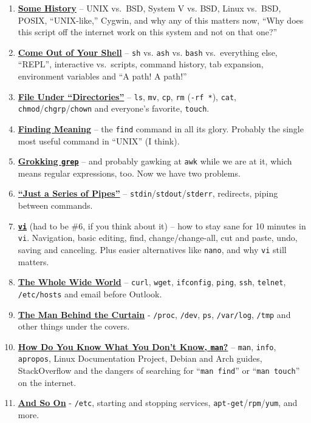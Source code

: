 \documentclass[10pt,]{book}
\numberwithin{figure}{chapter}
\begin{document}
\begin{enumerate}
\def\labelenumi{\arabic{enumi}.}
\setcounter{enumi}{-1}
\item
  \hyperref[step-0.-some-history]{\textbf{Some History}} -- UNIX
  vs.~BSD, System V vs. BSD, Linux vs.~BSD, POSIX, ``UNIX-like,''
  Cygwin, and why any of this matters now, ``Why does this script off
  the internet work on this system and not on that one?''
\item
  \hyperref[step-1.-come-out-of-your-shell]{\textbf{Come Out of Your
  Shell}} -- \texttt{sh} vs. \texttt{ash} vs. \texttt{bash}
  vs.~everything else, ``REPL'', interactive vs.~scripts, command
  history, tab expansion, environment variables and ``A path! A path!''
\item
  \hyperref[step-2.-file-under-directories]{\textbf{File Under
  ``Directories''}} -- \texttt{ls}, \texttt{mv}, \texttt{cp},
  \texttt{rm} (\texttt{-rf *}), \texttt{cat},
  \texttt{chmod}/\texttt{chgrp}/\texttt{chown} and everyone's favorite,
  \texttt{touch}.
\item
  \hyperref[step-3.-finding-meaning]{\textbf{Finding Meaning}} -- the
  \texttt{find} command in all its glory. Probably the single most
  useful command in ``UNIX'' (I think).
\item
  \hyperref[step-4.-grokking-grep]{\textbf{Grokking \texttt{grep}}} --
  and probably gawking at \texttt{awk} while we are at it, which means
  regular expressions, too. Now we have two problems.
\item
  \hyperref[step-5.-just-a-series-of-pipes]{\textbf{``Just a Series of
  Pipes''}} -- \texttt{stdin}/\texttt{stdout}/\texttt{stderr},
  redirects, piping between commands.
\item
  \hyperref[step-6.-vi]{\textbf{\texttt{vi}}} (had to be \#6, if you
  think about it) -- how to stay sane for 10 minutes in \texttt{vi}.
  Navigation, basic editing, find, change/change-all, cut and paste,
  undo, saving and canceling. Plus easier alternatives like
  \texttt{nano}, and why \texttt{vi} still matters.
\item
  \hyperref[step-7.-the-whole-wide-world]{\textbf{The Whole Wide World}}
  -- \texttt{curl}, \texttt{wget}, \texttt{ifconfig}, \texttt{ping},
  \texttt{ssh}, \texttt{telnet}, \texttt{/etc/hosts} and email before
  Outlook.
\item
  \hyperref[step-8.-the-man-behind-the-curtain]{\textbf{The Man Behind
  the Curtain}} - \texttt{/proc}, \texttt{/dev}, \texttt{ps},
  \texttt{/var/log}, \texttt{/tmp} and other things under the covers.
\item
  \hyperref[step-9.-how-do-you-know-what-you-dont-know-man]{\textbf{How
  Do You Know What You Don't Know, \texttt{man}?}} -- \texttt{man},
  \texttt{info}, \texttt{apropos}, Linux Documentation Project, Debian
  and Arch guides, StackOverflow and the dangers of searching for
  ``\texttt{man find}'' or ``\texttt{man touch}'' on the internet.
\item
  \hyperref[step-10.-and-so-on]{\textbf{And So On}} - \texttt{/etc},
  starting and stopping services,
  \texttt{apt-get}/\texttt{rpm}/\texttt{yum}, and more.
\end{enumerate}
\end{document}
